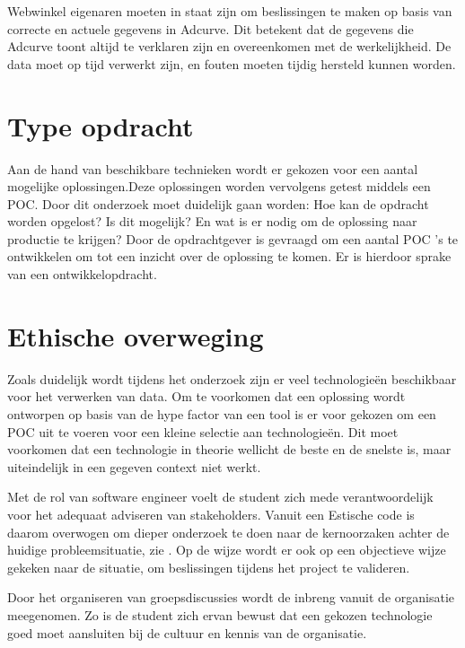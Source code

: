 Webwinkel eigenaren moeten in staat zijn om beslissingen te maken op basis van correcte en actuele gegevens in Adcurve. Dit betekent dat de gegevens die Adcurve toont altijd te verklaren zijn en overeenkomen met de werkelijkheid. De data moet op tijd verwerkt zijn, en fouten moeten tijdig hersteld kunnen worden.

\section{Type opdracht}

Aan de hand van beschikbare technieken wordt er gekozen voor een aantal mogelijke oplossingen.\newline Deze oplossingen worden vervolgens getest middels een POC. Door dit onderzoek moet duidelijk gaan worden: Hoe kan de opdracht worden opgelost? Is dit mogelijk? En wat is er nodig om de oplossing naar productie te krijgen? Door de opdrachtgever is gevraagd om een aantal POC 's te ontwikkelen om tot een inzicht over de oplossing te komen. Er is hierdoor sprake van een ontwikkelopdracht.


\section{Ethische overweging}

Zoals duidelijk wordt tijdens het onderzoek zijn er veel technologieën beschikbaar voor het verwerken van data. Om te voorkomen dat een oplossing wordt ontworpen op basis van de hype factor van een tool is er voor gekozen om een POC uit te voeren voor een kleine selectie aan technologieën.
Dit moet voorkomen dat een technologie in theorie wellicht de beste en de snelste is, maar uiteindelijk in een gegeven context niet werkt.

Met de rol van software engineer voelt de student zich mede verantwoordelijk voor het adequaat adviseren van stakeholders. Vanuit een Estische code is daarom overwogen om dieper onderzoek te doen naar de kernoorzaken achter de huidige probleemsituatie, zie \label{sec:deelvraag3}.
Op de wijze wordt er ook op een objectieve wijze gekeken naar de situatie, om beslissingen tijdens het  project te valideren.

Door het organiseren van groepsdiscussies wordt de inbreng vanuit de organisatie meegenomen. Zo is de student zich ervan bewust dat een gekozen technologie goed moet aansluiten bij de cultuur en kennis van de organisatie.


